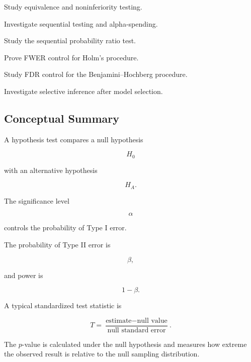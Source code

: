\begin{exercise}[4]
Study equivalence and noninferiority testing.
\end{exercise}

\begin{exercise}[4]
Investigate sequential testing and alpha-spending.
\end{exercise}

\begin{exercise}[4]
Study the sequential probability ratio test.
\end{exercise}

\begin{exercise}[4]
Prove FWER control for Holm's procedure.
\end{exercise}

\begin{exercise}[4]
Study FDR control for the Benjamini--Hochberg procedure.
\end{exercise}

\begin{exercise}[4]
Investigate selective inference after model selection.
\end{exercise}

\subsection{Conceptual Summary}
\label{subsec:hypothesis-testing-summary}

A hypothesis test compares a null hypothesis

\[
\boxed{
H_0
}
\]

with an alternative hypothesis

\[
\boxed{
H_A.
}
\]

The significance level

\[
\boxed{
\alpha
}
\]

controls the probability of Type I error.

The probability of Type II error is

\[
\boxed{
\beta,
}
\]

and power is

\[
\boxed{
1-\beta.
}
\]

A typical standardized test statistic is

\[
\boxed{
T
=
\frac{
\text{estimate}-\text{null value}
}{
\text{null standard error}
}.
}
\]

The \(p\)-value is calculated under the null hypothesis and measures how
extreme the observed result is relative to the null sampling
distribution.

